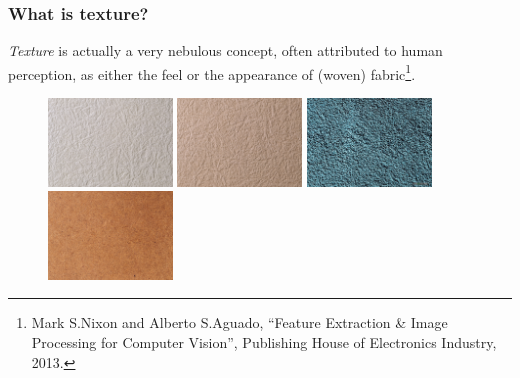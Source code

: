 \documentclass[notheorems,serif,table,compress]{beamer}  %
\begin{document}
\begin{frame}
\frametitle{What is texture?}
{\color{blue}\emph{Texture}} is actually a very nebulous concept, often attributed to human perception, as either the feel or the appearance of (woven) fabric\footnote{Mark S.Nixon and Alberto S.Aguado, ``Feature Extraction \& Image Processing for Computer Vision'', Publishing House of Electronics Industry, 2013.}.
\begin{figure}[!ht]
  \begin{minipage}[t]{0.35\textwidth}
  \includegraphics[width=1.3in]{texture1.jpg}
  \end{minipage}
  \begin{minipage}[t]{0.35\textwidth}
  \includegraphics[width=1.3in]{texture2.jpg}
  \end{minipage}
  \begin{minipage}[t]{0.35\textwidth}
  \includegraphics[width=1.3in]{texture3.jpg}
  \end{minipage}
  \begin{minipage}[t]{0.35\textwidth}
  \includegraphics[width=1.3in]{texture4.jpg}
  \end{minipage}
  \end{figure} 
\end{frame}

%
\end{document}
